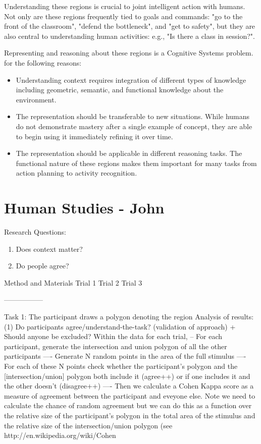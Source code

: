 \documentclass[11pt,letterpaper]{article}
\begin{document}
Understanding these regions is crucial to joint intelligent action with humans.  Not only are these regions frequently tied to goals and commands: "go to the front of the classroom", "defend the bottleneck", and "get to safety", but they are also central to understanding human activities: e.g., "Is there a class in session?".

Representing and reasoning about these regions is a Cognitive Systems problem. for the following reasons:
\begin{itemize}
\item Understanding context requires integration of different types of knowledge including geometric, semantic, and functional knowledge about the environment.
\item The representation should be transferable to new situations.  While humans do not demonstrate mastery after a single example of concept, they are able to begin using it immediately refining it over time.
\item The representation should be applicable in different reasoning tasks.  The functional nature of these regions makes them important for many tasks from action planning to activity recognition.
\end{itemize}
 
 

\section{Human Studies - John}
Research Questions: 
\begin{enumerate}
	\item Does context matter?
	\item Do people agree? 
\end{enumerate}

Method and Materials 
Trial 1
Trial 2
Trial 3

-----------------

Task 1: The participant draws a polygon denoting the region
Analysis of results:
(1) Do participants agree/understand-the-task? (validation of approach) + Should anyone be excluded?
Within the data for each trial,
-- For each participant, generate the intersection and union polygon of all the other participants
---- Generate N random points in the area of the full stimulus
---- For each of these N points check whether the participant's polygon and the [intersection/union] polygon both include it (agree++) or if one includes it and the other doesn't (disagree++)
---- Then we calculate a Cohen Kappa score as a measure of agreement between the participant and eveyone else. Note we need to calculate the chance of random agreement but we can do this as a function over the relative size of the participant's polygon in the total area of the stimulus and the relative size of the intersection/union polygon
(see http://en.wikipedia.org/wiki/Cohen%
\end{document}
